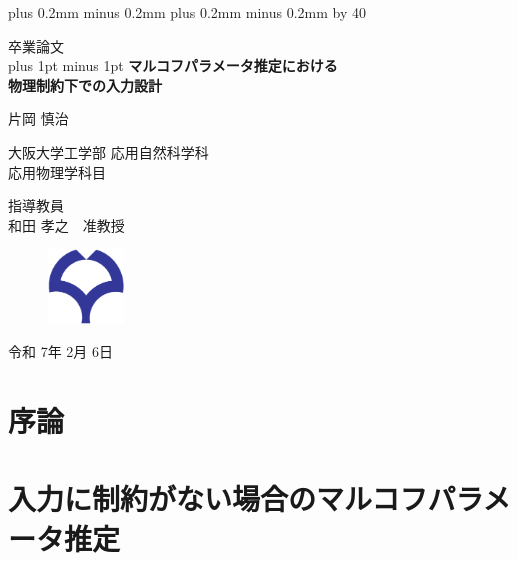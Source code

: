 \documentclass[a4paper,12pt,oneside,openany]{jsbook}
\def\kcharparline#1{%
   \ifx\xkanjiskip\undefined%
   \jintercharskip 0mm plus 0.2mm minus 0.2mm
   \else
   \xkanjiskip 0mm plus 0.2mm minus 0.2mm
   \fi
   \settowidth{\textwidth}{あ}%
   \multiply\textwidth by #1}
\begin{document}
\kcharparline{40} %

\begin{titlepage}
\begin{center}
	{\Large 卒業論文\\}
	\vspace{ 5mm }
	\baselineskip 35pt plus 1pt minus 1pt
	{\bf {\huge マルコフパラメータ推定における \\物理制約下での入力設計}}
	
	\vspace{ 30mm }
	{\LARGE 片岡 慎治 \\}
	
	\vspace{ 10mm }
	{\large 大阪大学工学部 応用自然科学科\\}
	{\large 応用物理学科目\\}
	
	\vspace{ 10mm }
	{\large 指導教員\\}
	{\large 和田 孝之　准教授 \\}
	
	\vspace{ 5mm }
	\begin{figure}[h]
	\centering
	\includegraphics[width=20mm]{osaka_logo.pdf}\\
	\end{figure}
	\vspace{ 5mm }
	{\large 令和 7年 2月 6日}
\end{center}
\end{titlepage}
\thispagestyle{empty}


\frontmatter

\tableofcontents

\mainmatter
% 
\chapter{序論}



\chapter{入力に制約がない場合のマルコフパラメータ推定}

\end{document}
